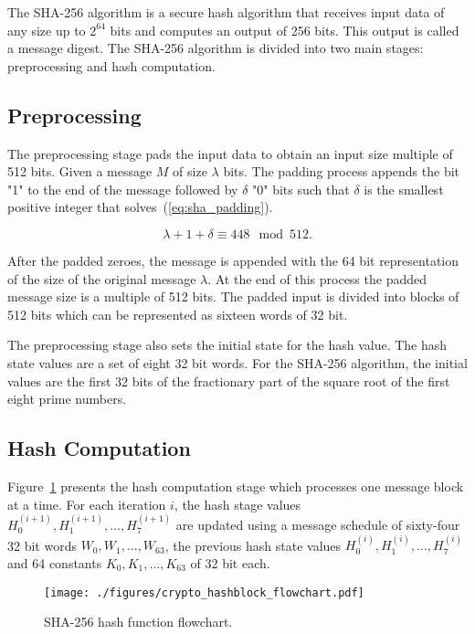 The SHA-256 algorithm \cite{SHA_NIST_FIPS} is a secure hash algorithm that
receives input data of any size up to $2^{64}$ bits and computes an output of
256 bits. This output is called a message digest.
The SHA-256 algorithm is divided into two main stages: preprocessing and hash
computation.

\subsection{Preprocessing}
\label{subsec:preprocessing}
The preprocessing stage pads the input data to obtain an input size multiple of
512 bits. Given a message $M$ of size $\lambda$ bits. The padding process
appends the bit "1" to the end of the message followed by $\delta$ "0" bits
such that $\delta$ is the smallest positive integer that
solves~(\ref{eq:sha_padding}).

\begin{equation}
\lambda + 1 + \delta \equiv 448 \mod 512.
\label{eq:sha_padding}
\end{equation}

After the padded zeroes, the message is appended with the 64 bit representation
of the size of the original message $\lambda$. At the end of this process the 
padded message size is a multiple of 512 bits. The padded input is divided into
blocks of 512 bits which can be represented as sixteen words of 32 bit. 

The preprocessing stage also sets the initial state for the hash value. The hash
state values are a set of eight 32 bit words. For the SHA-256 algorithm, the
initial values are the first 32 bits of the fractionary part of the square root
of the first eight prime numbers.

\subsection{Hash Computation}
\label{subsec:hash_computation}

Figure~\ref{fig:hash_flowchart} presents the hash computation stage which
processes one message block at a time. For each iteration $i$, the hash stage
values $H_{0}^{(i+1)}, H_{1}^{(i+1)},..., H_{7}^{(i+1)}$ are updated using a
message schedule of sixty-four 32 bit words $W_0, W_1,..., W_{63}$, the previous hash
state values $H_{0}^{(i)}, H_{1}^{(i)},..., H_{7}^{(i)}$ and 64 constants 
$K_{0},K_{1},...,K_{63}$ of 32 bit each.

\begin{figure}[!htbp]
    \centerline{\texttt{[image: ./figures/crypto\_hashblock\_flowchart.pdf]}}
    \vspace{0cm}\caption{SHA-256 hash function flowchart.}
    \label{fig:hash_flowchart}
\end{figure}

